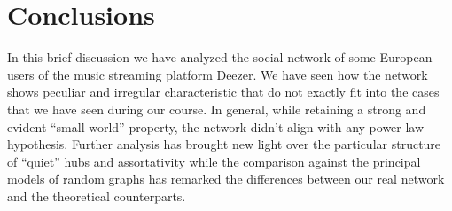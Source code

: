 \documentclass[12pt]{article}
\begin{document}
\section{Conclusions}
In this brief discussion we have analyzed the social network of some European users of the music streaming platform Deezer. We have seen how the network shows peculiar and irregular characteristic that do not exactly fit into the cases that we have seen during our course. In general, while retaining a strong and evident ``small world'' property, the network didn't align with any power law hypothesis. Further analysis has brought new light over the particular structure of ``quiet'' hubs and assortativity while the comparison against the principal models of random graphs has remarked the differences between our real network and the theoretical counterparts.
\end{document}
